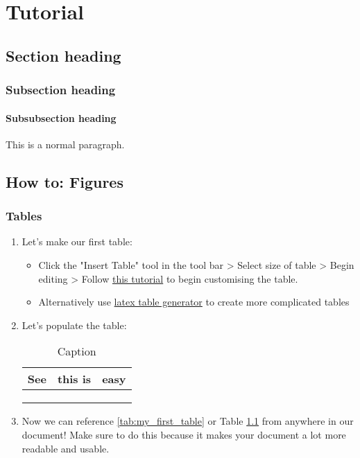 \documentclass[class=report,11pt,crop=false]{standalone}
\begin{document}
\chapter{Tutorial}


\section{Section heading} %
\subsection{Subsection heading} %
\subsubsection{Subsubsection heading}  %

This is a normal paragraph.

\section{How to: Figures}
\subsection{Tables}
\begin{enumerate}
    \item Let's make our first table:
        \begin{itemize}
            \item Click the "Insert Table" tool in the tool bar > Select size of table > Begin editing > Follow \href{https://www.overleaf.com/learn/latex/Tables}{this tutorial} to begin customising the table.
            \item Alternatively use \href{https://www.tablesgenerator.com}{latex table generator} to create more complicated tables
        \end{itemize}
    \item Let's populate the table:
        \begin{table}
            \centering
            \begin{tabular}{|c|cc|}
                \hline
                \textbf{See} & \textbf{this is} & \textbf{easy}\\
                \hline
                 &  & \\
                 &  & \\
                 &  & \\
                 \hline \hline
            \end{tabular}
            \caption{Caption}
            \label{tab:my_first_table}
        \end{table}
    \item Now we can reference \autoref{tab:my_first_table} or Table \ref{tab:my_first_table} from anywhere in our document! Make sure to do this because it makes your document a lot more readable and usable.
\end{enumerate}
\end{document}
